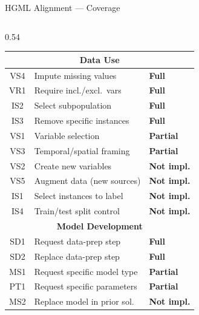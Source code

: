 \documentclass[aspectratio=169,10pt,english,dvipsnames]{beamer}
\begin{document}
\begin{frame}{HGML Alignment --- Coverage} \small
  \begin{columns}[T]
    \begin{column}{0.54\textwidth}
      \begin{table}
        \centering\tiny
        \renewcommand{\arraystretch}{1.2}
        \begin{tabular}{c p{2.6cm} l}
          \toprule
          \multicolumn{3}{c}{\textbf{Data Use}} \\
          \midrule
          VS4 & Impute missing values        & \cellcolor{UCgreen!25}\textbf{Full} \\
          VR1 & Require incl./excl.\ vars    & \cellcolor{UCgreen!25}\textbf{Full} \\
          IS2 & Select subpopulation         & \cellcolor{UCgreen!25}\textbf{Full} \\
          IS3 & Remove specific instances    & \cellcolor{UCgreen!25}\textbf{Full} \\
          VS1 & Variable selection           & \cellcolor{UCorange!25}\textbf{Partial} \\
          VS3 & Temporal/spatial framing     & \cellcolor{UCorange!25}\textbf{Partial} \\
          VS2 & Create new variables         & \cellcolor{UCred!20}\textbf{Not impl.} \\
          VS5 & Augment data (new sources)   & \cellcolor{UCred!20}\textbf{Not impl.} \\
          IS1 & Select instances to label    & \cellcolor{UCred!20}\textbf{Not impl.} \\
          IS4 & Train/test split control     & \cellcolor{UCred!20}\textbf{Not impl.} \\
          \midrule
          \multicolumn{3}{c}{\textbf{Model Development}} \\
          \midrule
          SD1 & Request data-prep step       & \cellcolor{UCgreen!25}\textbf{Full} \\
          SD2 & Replace data-prep step       & \cellcolor{UCgreen!25}\textbf{Full} \\
          MS1 & Request specific model type  & \cellcolor{UCorange!25}\textbf{Partial} \\
          PT1 & Request specific parameters  & \cellcolor{UCorange!25}\textbf{Partial} \\
          MS2 & Replace model in prior sol.  & \cellcolor{UCred!20}\textbf{Not impl.} \\

\end{tabular}
\end{table}
\end{column}
\end{columns}
\end{frame}
\end{document}
